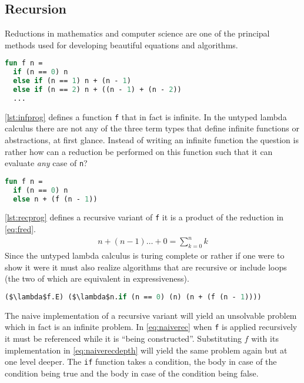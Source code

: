 \documentclass[11pt,oneside,a4paper]{report}
\begin{document}
\subsection{Recursion}
\label{sec:lamrec}
\noindent Reductions in mathematics and computer science are one of the principal methods used for developing beautiful equations and algorithms.
\begin{lstlisting}[float,language=ML,caption={Infinite program},label={lst:infprog}]
fun f n = 
  if (n == 0) n
  else if (n == 1) n + (n - 1)
  else if (n == 2) n + ((n - 1) + (n - 2))
  ...
\end{lstlisting}
\autoref{lst:infprog} defines a function \texttt{f} that in fact is infinite.
In the untyped lambda calculus there are not any of the three term types that define infinite functions or abstractions, at first glance.
Instead of writing an infinite function the question is rather how can a reduction be performed on this function such that it can evaluate \textit{any} case of \texttt{n}?
\begin{lstlisting}[float,language=ML,caption={Recursive program},label={lst:recprog}]
fun f n = 
  if (n == 0) n
  else n + (f (n - 1))
\end{lstlisting}
\autoref{lst:recprog} defines a recursive variant of \texttt{f} it is a product of the reduction in \autoref{eq:fred}.
\begin{align}
    n + (n - 1) \dots + 0 = \sum_{k = 0}^n k
    \label{eq:fred}
\end{align}
Since the untyped lambda calculus is turing complete or rather if one were to show it were it must also realize algorithms that are recursive or include loops (the two of which are equivalent in expressiveness).
\begin{lstlisting}[float,language=ML,caption={Recursive function},label={eq:naiverec},mathescape=true]
($\lambda$f.E) ($\lambda$n.if (n == 0) (n) (n + (f (n - 1))))
\end{lstlisting}
The naive implementation of a recursive variant will yield an unsolvable problem which in fact is an infinite problem.
In \autoref{eq:naiverec} when \texttt{f} is applied recursively it must be referenced while it is ``being constructed''.
Substituting $f$ with its implementation in \autoref{eq:naiverecdepth} will yield the same problem again but at one level deeper.
The \texttt{if} function takes a condition, the body in case of the condition being true and the body in case of the condition being false.
\end{document}

